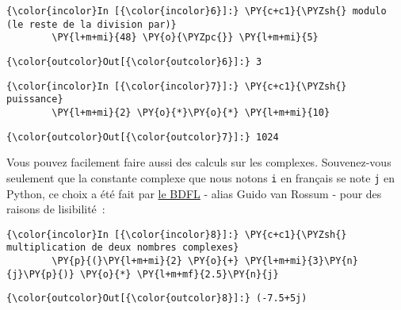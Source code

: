     \begin{Verbatim}[commandchars=\\\{\},frame=single,framerule=0.3mm,rulecolor=\color{cellframecolor}]
{\color{incolor}In [{\color{incolor}6}]:} \PY{c+c1}{\PYZsh{} modulo (le reste de la division par)}
        \PY{l+m+mi}{48} \PY{o}{\PYZpc{}} \PY{l+m+mi}{5}
\end{Verbatim}


\begin{Verbatim}[commandchars=\\\{\},frame=single,framerule=0.3mm,rulecolor=\color{cellframecolor}]
{\color{outcolor}Out[{\color{outcolor}6}]:} 3
\end{Verbatim}
            
    \begin{Verbatim}[commandchars=\\\{\},frame=single,framerule=0.3mm,rulecolor=\color{cellframecolor}]
{\color{incolor}In [{\color{incolor}7}]:} \PY{c+c1}{\PYZsh{} puissance}
        \PY{l+m+mi}{2} \PY{o}{*}\PY{o}{*} \PY{l+m+mi}{10}
\end{Verbatim}


\begin{Verbatim}[commandchars=\\\{\},frame=single,framerule=0.3mm,rulecolor=\color{cellframecolor}]
{\color{outcolor}Out[{\color{outcolor}7}]:} 1024
\end{Verbatim}
            
    Vous pouvez facilement faire aussi des calculs sur les complexes.
Souvenez-vous seulement que la constante complexe que nous notons
\texttt{i} en français se note \texttt{j} en Python, ce choix a été fait
par \href{https://fr.wikipedia.org/wiki/Benevolent_Dictator_for_Life}{le
BDFL} - alias Guido van Rossum - pour des raisons de lisibilité~:

    \begin{Verbatim}[commandchars=\\\{\},frame=single,framerule=0.3mm,rulecolor=\color{cellframecolor}]
{\color{incolor}In [{\color{incolor}8}]:} \PY{c+c1}{\PYZsh{} multiplication de deux nombres complexes}
        \PY{p}{(}\PY{l+m+mi}{2} \PY{o}{+} \PY{l+m+mi}{3}\PY{n}{j}\PY{p}{)} \PY{o}{*} \PY{l+m+mf}{2.5}\PY{n}{j}
\end{Verbatim}


\begin{Verbatim}[commandchars=\\\{\},frame=single,framerule=0.3mm,rulecolor=\color{cellframecolor}]
{\color{outcolor}Out[{\color{outcolor}8}]:} (-7.5+5j)
\end{Verbatim}
            
